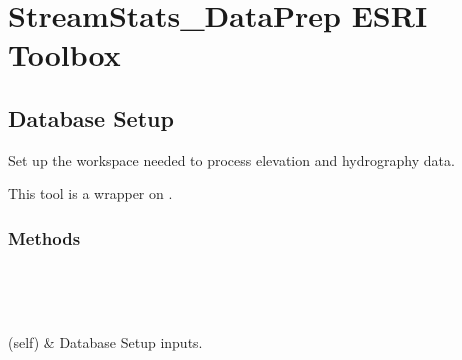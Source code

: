 \documentclass[letterpaper,10pt,english]{sphinxmanual}
\begin{document}
\section{StreamStats\_DataPrep ESRI Toolbox}
\label{\detokenize{StreamStats_DataPrep:streamstats-dataprep-esri-toolbox}}\label{\detokenize{StreamStats_DataPrep::doc}}

\subsection{Database Setup}
\label{\detokenize{StreamStats_DataPrep:database-setup}}

\begin{fulllineitems}
\label{\detokenize{StreamStats_DataPrep:StreamStats_DataPrep.databaseSetup}}
Set up the workspace needed to process elevation and hydrography data.

This tool is a wrapper on {\hyperref[\detokenize{databaseSetup:databaseSetup.databaseSetup}]{}}.
\subsubsection*{Methods}


\begin{savenotes}\sphinxatlongtablestart\begin{longtable}{}
\hline

\endfirsthead

%
{}\\
\hline

\endhead

\hline
{}\\
\endfoot

\endlastfoot

{\hyperref[\detokenize{StreamStats_DataPrep:StreamStats_DataPrep.databaseSetup.getParameterInfo}]{}}(self)
&
Database Setup inputs.
\\
\hline
\end{longtable}\sphinxatlongtableend\end{savenotes}


\end{fulllineitems}
\end{document}
